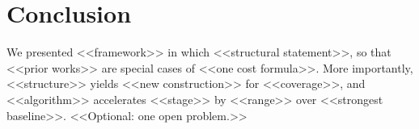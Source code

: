 \section{Conclusion}\label{sec:conclusion}
We presented <<framework>> in which <<structural statement>>, so that <<prior works>> are
special cases of <<one cost formula>>. More importantly, <<structure>> yields <<new
construction>> for <<coverage>>, and <<algorithm>> accelerates <<stage>> by <<range>> over
<<strongest baseline>>. <<Optional: one open problem.>>
